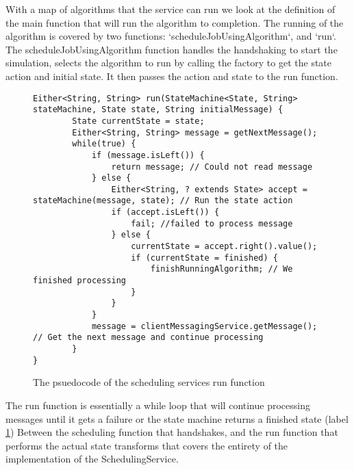 \documentclass[a4paper]{article} %
\begin{document}
\newline
With a map of algorithms that the service can run we look at the definition of the main function that will run the algorithm to completion.
The running of the algorithm is covered by two functions: `scheduleJobUsingAlgorithm`, and `run`.
The scheduleJobUsingAlgorithm function handles the handshaking to start the simulation, selects the algorithm to run by calling the factory to get the state action and initial state.
It then passes the action and state to the run function.
\newline

\begin{figure}[ht!]
\begin{lstlisting}
Either<String, String> run(StateMachine<State, String> stateMachine, State state, String initialMessage) {
        State currentState = state;
        Either<String, String> message = getNextMessage();
        while(true) {
            if (message.isLeft()) {
                return message; // Could not read message
            } else {
                Either<String, ? extends State> accept = stateMachine(message, state); // Run the state action
                if (accept.isLeft()) {
                    fail; //failed to process message
                } else {
                    currentState = accept.right().value();
                    if (currentState = finished) { 
                        finishRunningAlgorithm; // We finished processing
                    }
                }
            }
            message = clientMessagingService.getMessage(); // Get the next message and continue processing
        }
}
\end{lstlisting}
\label{run_psuedocode}
\caption{The psuedocode of the scheduling services run function}
\end{figure}
The run function is essentially a while loop that will continue processing messages until it gets a failure or the state machine returns a finished state (label \ref{run_psuedocode})
Between the scheduling function that handshakes, and the run function that performs the actual state transforms that covers the entirety of the implementation of the SchedulingService.
\end{document}
